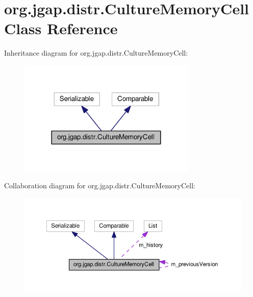 \hypertarget{classorg_1_1jgap_1_1distr_1_1_culture_memory_cell}{\section{org.\-jgap.\-distr.\-Culture\-Memory\-Cell Class Reference}
\label{classorg_1_1jgap_1_1distr_1_1_culture_memory_cell}
}


Inheritance diagram for org.\-jgap.\-distr.\-Culture\-Memory\-Cell\-:
\nopagebreak
\begin{figure}[H]
\begin{center}
\leavevmode
\includegraphics[width=240pt]{classorg_1_1jgap_1_1distr_1_1_culture_memory_cell__inherit__graph}
\end{center}
\end{figure}


Collaboration diagram for org.\-jgap.\-distr.\-Culture\-Memory\-Cell\-:
\nopagebreak
\begin{figure}[H]
\begin{center}
\leavevmode
\includegraphics[width=350pt]{classorg_1_1jgap_1_1distr_1_1_culture_memory_cell__coll__graph}
\end{center}
\end{figure}
